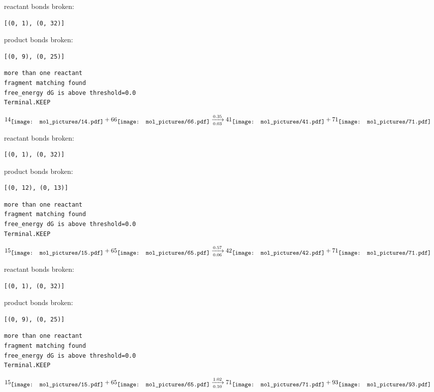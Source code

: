 \documentclass{article}
\begin{document}
reactant bonds broken:\begin{verbatim}
[(0, 1), (0, 32)]
\end{verbatim}
product bonds broken:\begin{verbatim}
[(0, 9), (0, 25)]
\end{verbatim}




\vspace{1cm}
\begin{verbatim}
more than one reactant
fragment matching found
free_energy dG is above threshold=0.0
Terminal.KEEP
\end{verbatim}
$$
14
\raisebox{-.5\height}{\texttt{[image: mol\_pictures/14.pdf]}}
+
66
\raisebox{-.5\height}{\texttt{[image: mol\_pictures/66.pdf]}}
\xrightarrow[0.03]{0.35}
41
\raisebox{-.5\height}{\texttt{[image: mol\_pictures/41.pdf]}}
+
71
\raisebox{-.5\height}{\texttt{[image: mol\_pictures/71.pdf]}}
$$


reactant bonds broken:\begin{verbatim}
[(0, 1), (0, 32)]
\end{verbatim}
product bonds broken:\begin{verbatim}
[(0, 12), (0, 13)]
\end{verbatim}




\vspace{1cm}
\begin{verbatim}
more than one reactant
fragment matching found
free_energy dG is above threshold=0.0
Terminal.KEEP
\end{verbatim}
$$
15
\raisebox{-.5\height}{\texttt{[image: mol\_pictures/15.pdf]}}
+
65
\raisebox{-.5\height}{\texttt{[image: mol\_pictures/65.pdf]}}
\xrightarrow[0.06]{0.57}
42
\raisebox{-.5\height}{\texttt{[image: mol\_pictures/42.pdf]}}
+
71
\raisebox{-.5\height}{\texttt{[image: mol\_pictures/71.pdf]}}
$$


reactant bonds broken:\begin{verbatim}
[(0, 1), (0, 32)]
\end{verbatim}
product bonds broken:\begin{verbatim}
[(0, 9), (0, 25)]
\end{verbatim}




\vspace{1cm}
\begin{verbatim}
more than one reactant
fragment matching found
free_energy dG is above threshold=0.0
Terminal.KEEP
\end{verbatim}
$$
15
\raisebox{-.5\height}{\texttt{[image: mol\_pictures/15.pdf]}}
+
65
\raisebox{-.5\height}{\texttt{[image: mol\_pictures/65.pdf]}}
\xrightarrow[0.10]{1.02}
71
\raisebox{-.5\height}{\texttt{[image: mol\_pictures/71.pdf]}}
+
93
\raisebox{-.5\height}{\texttt{[image: mol\_pictures/93.pdf]}}
$$
\end{document}
